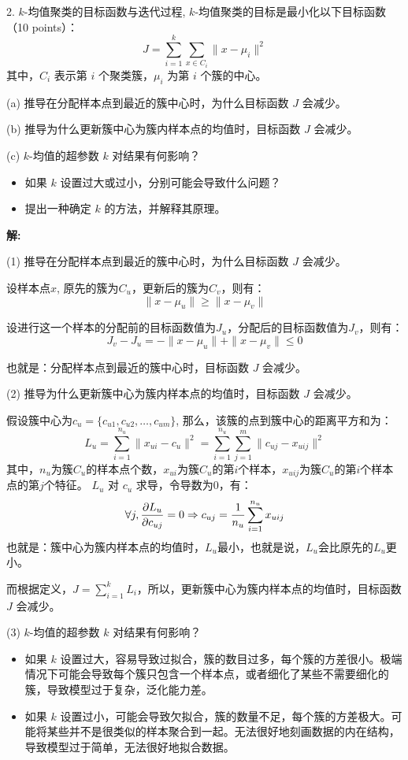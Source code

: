 \documentclass[8pt]{article}
\begin{document}
2. \( k \)-均值聚类的目标函数与迭代过程, \( k \)-均值聚类的目标是最小化以下目标函数（10 points）：  
\[
J = \sum_{i=1}^k \sum_{x \in C_i} \|x - \mu_i\|^2
\]  
其中，\( C_i \) 表示第 \( i \) 个聚类簇，\( \mu_i \) 为第 \( i \) 个簇的中心。  

(a) 推导在分配样本点到最近的簇中心时，为什么目标函数 \( J \) 会减少。 

(b) 推导为什么更新簇中心为簇内样本点的均值时，目标函数 \( J \) 会减少。 

(c) \( k \)-均值的超参数 \( k \) 对结果有何影响？  
\begin{itemize}
    \item  如果 \( k \) 设置过大或过小，分别可能会导致什么问题？  
    \item 提出一种确定 \( k \) 的方法，并解释其原理。  
\end{itemize}

\textbf{\large 解:}

(1) 推导在分配样本点到最近的簇中心时，为什么目标函数 \( J \) 会减少。

设样本点$x$, 原先的簇为$C_u$，更新后的簇为$C_v$，则有：
\[\|x-\mu_u\| \ge \|x-\mu_v\|\]

设进行这一个样本的分配前的目标函数值为$J_u$，分配后的目标函数值为$J_v$，则有：
\[J_v - J_u = - \|x-\mu_u\| + \|x-\mu_v\| \le 0 \]

也就是：分配样本点到最近的簇中心时，目标函数 \( J \) 会减少。

(2) 推导为什么更新簇中心为簇内样本点的均值时，目标函数 \( J \) 会减少。

假设簇中心为$c_u = \{c_{u1}, c_{u2}, \dots , c_{um}\}$, 那么，该簇的点到簇中心的距离平方和为：
\[
    L_u = \sum_{i=1}^{n_u}{\|x_{ui} - c_u\|^2} = \sum_{i=1}^{n_u}\sum_{j=1}^{m} \|c_{uj} - x_{uij}\|^2
\]
其中，$n_u$为簇$C_u$的样本点个数，$x_{ui}$为簇$C_u$的第$i$个样本，$x_{uij}$为簇$C_u$的第$i$个样本点的第$j$个特征。
$L_u$ 对 $c_u$ 求导，令导数为0，有：
\[
    \forall j, \space \frac{\partial L_u}{\partial c_{uj}} = 0 \Rightarrow c_{uj} = \frac{1}{n_u}\sum_{i=1}^{n_u}x_{uij}
\] 
也就是：簇中心为簇内样本点的均值时，$L_u$最小，也就是说，$L_u$会比原先的$L_u$更小。

而根据定义，$J = \sum_{i=1}^{k} L_i$，所以，更新簇中心为簇内样本点的均值时，目标函数 \( J \) 会减少。

(3) \( k \)-均值的超参数 \( k \) 对结果有何影响？ 

\begin{itemize}
    \item 如果 \( k \) 设置过大，容易导致过拟合，簇的数目过多，每个簇的方差很小。极端情况下可能会导致每个簇只包含一个样本点，或者细化了某些不需要细化的簇，导致模型过于复杂，泛化能力差。
    \item 如果 \( k \) 设置过小，可能会导致欠拟合，簇的数量不足，每个簇的方差极大。可能将某些并不是很类似的样本聚合到一起。无法很好地刻画数据的内在结构，导致模型过于简单，无法很好地拟合数据。
\end{itemize}
\end{document}
